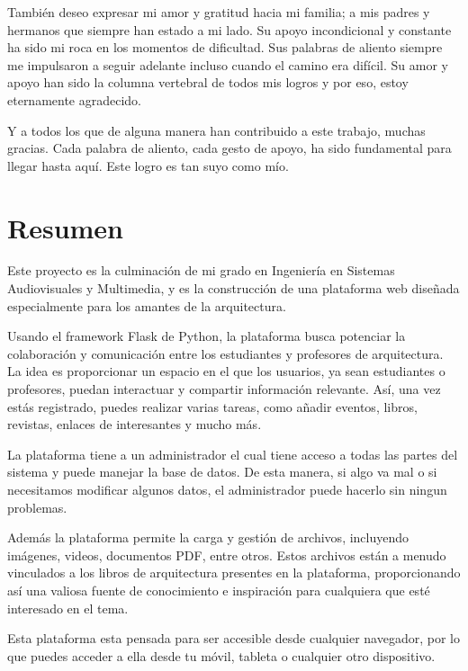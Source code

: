 \documentclass[a4paper, 12pt]{book}
\begin{document}
También deseo expresar mi amor y gratitud hacia mi familia; a mis padres y hermanos que siempre han estado a mi lado. 
Su apoyo incondicional y constante ha sido mi roca en los momentos de dificultad. Sus palabras de aliento siempre me 
impulsaron a seguir adelante incluso cuando el camino era difícil. Su amor y apoyo han sido la columna vertebral de 
todos mis logros y por eso, estoy eternamente agradecido. 

Y a todos los que de alguna manera han contribuido a este trabajo, muchas gracias. Cada palabra de aliento, cada 
gesto de apoyo, ha sido fundamental para llegar hasta aquí. Este logro es tan suyo como mío.



\chapter*{Resumen}

Este proyecto es la culminación de mi grado en Ingeniería en Sistemas Audiovisuales y Multimedia, y es la construcción de una 
plataforma web diseñada especialmente para los amantes de la arquitectura. 

Usando el framework Flask de Python, la plataforma busca potenciar la colaboración y comunicación entre los estudiantes y profesores 
de arquitectura. La idea es proporcionar un espacio en el que los usuarios, ya sean estudiantes o profesores, puedan interactuar y 
compartir información relevante. Así, una vez estás registrado, puedes realizar varias tareas, como añadir eventos, libros, revistas, 
enlaces de interesantes y mucho más. 

La plataforma tiene a un administrador el cual tiene acceso a todas las partes del sistema y puede manejar la base de datos. 
De esta manera, si algo va mal o si necesitamos modificar algunos datos, el administrador puede hacerlo sin ningun problemas.

Además la plataforma permite la carga y gestión de archivos, incluyendo imágenes, videos, documentos PDF, entre otros. Estos 
archivos están a menudo vinculados a los libros de arquitectura presentes en la plataforma, proporcionando así una valiosa fuente de 
conocimiento e inspiración para cualquiera que esté interesado en el tema. 

Esta plataforma esta pensada para ser accesible desde cualquier navegador, por lo que puedes acceder a ella desde tu móvil, tableta o 
cualquier otro dispositivo. 
\end{document}
